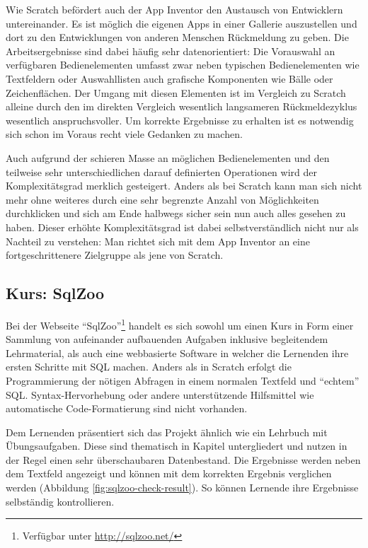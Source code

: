 Wie Scratch befördert auch der App Inventor den Austausch von Entwicklern untereinander. Es ist möglich die eigenen Apps in einer Gallerie auszustellen und dort zu den Entwicklungen von anderen Menschen Rückmeldung zu geben. Die Arbeitsergebnisse sind dabei häufig sehr datenorientiert: Die Vorauswahl an verfügbaren Bedienelementen umfasst zwar neben typischen Bedienelementen wie Textfeldern oder Auswahllisten auch grafische Komponenten wie Bälle oder Zeichenflächen. Der Umgang mit diesen Elementen ist im Vergleich zu Scratch alleine durch den im direkten Vergleich wesentlich langsameren Rückmeldezyklus wesentlich anspruchsvoller. Um korrekte Ergebnisse zu erhalten ist es notwendig sich schon im Voraus recht viele Gedanken zu machen.

Auch aufgrund der schieren Masse an möglichen Bedienelementen und den teilweise sehr unterschiedlichen darauf definierten Operationen wird der Komplexitätsgrad merklich gesteigert. Anders als bei Scratch kann man sich nicht mehr ohne weiteres durch eine sehr begrenzte Anzahl von Möglichkeiten durchklicken und sich am Ende halbwegs sicher sein nun auch alles gesehen zu haben. Dieser erhöhte Komplexitätsgrad ist dabei selbstverständlich nicht nur als Nachteil zu verstehen: Man richtet sich mit dem App Inventor an eine fortgeschrittenere Zielgruppe als jene von Scratch.

\subsection{Kurs: SqlZoo}

Bei der Webseite "`SqlZoo"'\footnote{Verfügbar unter \url{http://sqlzoo.net/}} handelt es sich sowohl um einen Kurs in Form einer Sammlung von aufeinander aufbauenden Aufgaben inklusive begleitendem Lehrmaterial, als auch eine webbasierte Software in welcher die Lernenden ihre ersten Schritte mit SQL machen. Anders als in Scratch erfolgt die Programmierung der nötigen Abfragen in einem normalen Textfeld und "`echtem"' SQL. Syntax-Hervorhebung oder andere unterstützende Hilfsmittel wie automatische Code-Formatierung sind nicht vorhanden.

Dem Lernenden präsentiert sich das Projekt ähnlich wie ein Lehrbuch mit Übungsaufgaben. Diese sind thematisch in Kapitel untergliedert und nutzen in der Regel einen sehr überschaubaren Datenbestand. Die Ergebnisse werden neben dem Textfeld angezeigt und können mit dem korrekten Ergebnis verglichen werden (Abbildung \ref{fig:sqlzoo-check-result}). So können Lernende ihre Ergebnisse selbständig kontrollieren.

